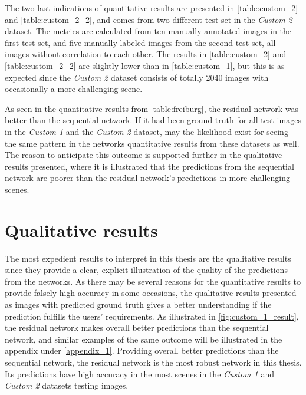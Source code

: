 \documentclass[USenglish]{ifimaster}  %
\begin{document}
The two last indications of quantitative results are presented in \vref{table:custom_2} and \vref{table:custom_2_2}, and comes from two different test set in the \textit{Custom 2} dataset. The metrics are calculated from ten manually annotated images in the first test set, and five manually labeled images from the second test set, all images without correlation to each other. The results in \vref{table:custom_2} and \vref{table:custom_2_2} are slightly lower than in \vref{table:custom_1}, but this is as expected since the \textit{Custom 2} dataset consists of totally 2040 images with occasionally a more challenging scene. 

As seen in the quantitative results from \vref{table:freiburg}, the residual network was better than the sequential network. If it had been ground truth for all test images in the \textit{Custom 1} and the \textit{Custom 2} dataset, may the likelihood exist for seeing the same pattern in the networks quantitative results from these datasets as well. The reason to anticipate this outcome is supported further in the qualitative results presented, where it is illustrated that the predictions from the sequential network are poorer than the residual network's predictions in more challenging scenes. 

\section{Qualitative results}
The most expedient results to interpret in this thesis are the qualitative results since they provide a clear, explicit illustration of the quality of the predictions from the networks. As there may be several reasons for the quantitative results to provide falsely high accuracy in some occasions, the qualitative results presented as images with predicted ground truth gives a better understanding if the prediction fulfills the users' requirements. As illustrated in \vref{fig:custom_1_result}, the residual network makes overall better predictions than the sequential network, and similar examples of the same outcome will be illustrated in the appendix under \vref{appendix_1}. Providing overall better predictions than the sequential network, the residual network is the most robust network in this thesis. Its predictions have high accuracy in the most scenes in the \textit{Custom 1} and \textit{Custom 2} datasets testing images.        
\end{document}
